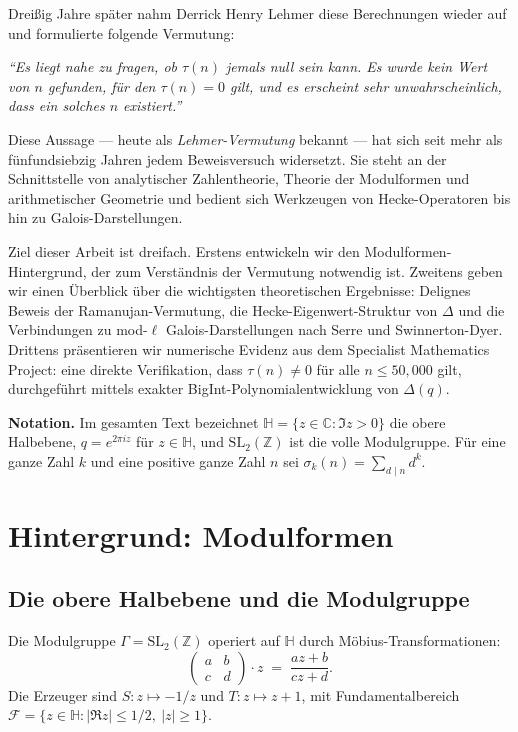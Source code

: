 \documentclass[12pt,a4paper]{amsart}
\theoremstyle{definition}
\begin{document}
Dreißig Jahre später nahm Derrick Henry Lehmer \cite{Lehmer1947} diese Berechnungen
wieder auf und formulierte folgende Vermutung:

\begin{center}
  \textit{``Es liegt nahe zu fragen, ob $\tau(n)$ jemals null sein kann. Es wurde
  kein Wert von $n$ gefunden, für den $\tau(n) = 0$ gilt, und es erscheint sehr
  unwahrscheinlich, dass ein solches $n$ existiert.''}
\end{center}

Diese Aussage --- heute als \emph{Lehmer-Vermutung} bekannt --- hat sich seit mehr
als fünfundsiebzig Jahren jedem Beweisversuch widersetzt. Sie steht an der
Schnittstelle von analytischer Zahlentheorie, Theorie der Modulformen und
arithmetischer Geometrie und bedient sich Werkzeugen von Hecke-Operatoren bis hin
zu Galois-Darstellungen.

Ziel dieser Arbeit ist dreifach. Erstens entwickeln wir den Modulformen-Hintergrund,
der zum Verständnis der Vermutung notwendig ist. Zweitens geben wir einen Überblick
über die wichtigsten theoretischen Ergebnisse: Delignes Beweis der
Ramanujan-Vermutung, die Hecke-Eigenwert-Struktur von $\Delta$ und die Verbindungen
zu mod-$\ell$ Galois-Darstellungen nach Serre und Swinnerton-Dyer. Drittens
präsentieren wir numerische Evidenz aus dem Specialist Mathematics Project: eine
direkte Verifikation, dass $\tau(n) \neq 0$ für alle $n \leq 50{,}000$ gilt,
durchgeführt mittels exakter BigInt-Polynomialentwicklung von $\Delta(q)$.

\medskip
\noindent\textbf{Notation.} Im gesamten Text bezeichnet $\mathbb{H} = \{z \in
\mathbb{C} : \Im z > 0\}$ die obere Halbebene, $q = e^{2\pi i z}$ für
$z \in \mathbb{H}$, und $\mathrm{SL}_2(\mathbb{Z})$ ist die volle Modulgruppe.
Für eine ganze Zahl $k$ und eine positive ganze Zahl $n$ sei
$\sigma_k(n) = \sum_{d \mid n} d^k$.

\section{Hintergrund: Modulformen}

\subsection{Die obere Halbebene und die Modulgruppe}

Die Modulgruppe $\Gamma = \mathrm{SL}_2(\mathbb{Z})$ operiert auf $\mathbb{H}$ durch
Möbius-Transformationen:
\[
  \begin{pmatrix} a & b \\ c & d \end{pmatrix} \cdot z
  \;=\; \frac{az+b}{cz+d}.
\]
Die Erzeuger sind $S: z \mapsto -1/z$ und $T: z \mapsto z+1$, mit Fundamentalbereich
$\mathcal{F} = \{z \in \mathbb{H} : |\Re z| \leq 1/2,\ |z| \geq 1\}$.
\end{document}
